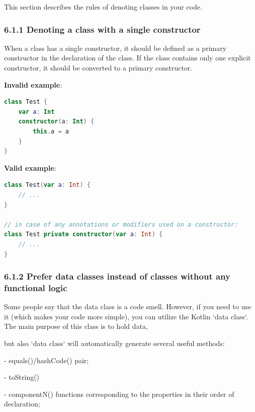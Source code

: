 {{{{\label{sec:6.1}

This section describes the rules of denoting classes in your code.

\subsubsection*{\textbf{6.1.1  Denoting a class with a single constructor}}
\leavevmode\newline

\label{sec:6.1.1}

When a class has a single constructor, it should be defined as a primary constructor in the declaration of the class. If the class contains only one explicit constructor, it should be converted to a primary constructor.



\textbf{Invalid example}:

\begin{lstlisting}[language=Kotlin]
class Test {
    var a: Int
    constructor(a: Int) {
        this.a = a
    }
}
\end{lstlisting}


\textbf{Valid example}:

\begin{lstlisting}[language=Kotlin]
class Test(var a: Int) { 
    // ...
}

// in case of any annotations or modifiers used on a constructor:
class Test private constructor(var a: Int) { 
    // ...
}
\end{lstlisting}


\subsubsection*{\textbf{6.1.2 Prefer data classes instead of classes without any functional logic}}
\leavevmode\newline

\label{sec:6.1.2}

Some people say that the data class is a code smell. However, if you need to use it (which makes your code more simple), you can utilize the Kotlin `data class`. The main purpose of this class is to hold data,

but also `data class` will automatically generate several useful methods:

- equals()/hashCode() pair;

- toString()

- componentN() functions corresponding to the properties in their order of declaration;

}}}}
